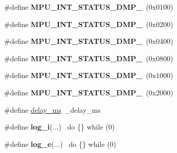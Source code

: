\begin{DoxyCompactItemize}
\item 
\#define {\bfseries M\+P\+U\+\_\+\+I\+N\+T\+\_\+\+S\+T\+A\+T\+U\+S\+\_\+\+D\+M\+P\+\_}~(0x0100)\hypertarget{group___d_r_i_v_e_r_s_ga2398e82f93220e3cfa1ef31bfb6d76bd}{}\label{group___d_r_i_v_e_r_s_ga2398e82f93220e3cfa1ef31bfb6d76bd}

\item 
\#define {\bfseries M\+P\+U\+\_\+\+I\+N\+T\+\_\+\+S\+T\+A\+T\+U\+S\+\_\+\+D\+M\+P\+\_}~(0x0200)\hypertarget{group___d_r_i_v_e_r_s_ga5ac2e94db5083456fa531fceee0997f5}{}\label{group___d_r_i_v_e_r_s_ga5ac2e94db5083456fa531fceee0997f5}

\item 
\#define {\bfseries M\+P\+U\+\_\+\+I\+N\+T\+\_\+\+S\+T\+A\+T\+U\+S\+\_\+\+D\+M\+P\+\_}~(0x0400)\hypertarget{group___d_r_i_v_e_r_s_gab7543433b9679174597e00e5d7cb6279}{}\label{group___d_r_i_v_e_r_s_gab7543433b9679174597e00e5d7cb6279}

\item 
\#define {\bfseries M\+P\+U\+\_\+\+I\+N\+T\+\_\+\+S\+T\+A\+T\+U\+S\+\_\+\+D\+M\+P\+\_}~(0x0800)\hypertarget{group___d_r_i_v_e_r_s_gaea5cac4528bb19757de4eb4fa46a374f}{}\label{group___d_r_i_v_e_r_s_gaea5cac4528bb19757de4eb4fa46a374f}

\item 
\#define {\bfseries M\+P\+U\+\_\+\+I\+N\+T\+\_\+\+S\+T\+A\+T\+U\+S\+\_\+\+D\+M\+P\+\_}~(0x1000)\hypertarget{group___d_r_i_v_e_r_s_ga4345dc987e1b65ef8ddc6160f592e144}{}\label{group___d_r_i_v_e_r_s_ga4345dc987e1b65ef8ddc6160f592e144}

\item 
\#define {\bfseries M\+P\+U\+\_\+\+I\+N\+T\+\_\+\+S\+T\+A\+T\+U\+S\+\_\+\+D\+M\+P\+\_}~(0x2000)\hypertarget{group___d_r_i_v_e_r_s_ga101643480b83c302a4a3089fe9149e8e}{}\label{group___d_r_i_v_e_r_s_ga101643480b83c302a4a3089fe9149e8e}

\item 
\#define \hyperlink{group___d_r_i_v_e_r_s_gae36aca5baf9b6b7d74992aef00686d67}{delay\+\_\+ms}~\+\_\+delay\+\_\+ms
\item 
\#define {\bfseries log\+\_\+i}(...)      ~do \{\} while (0)\hypertarget{group___d_r_i_v_e_r_s_ga67fc07fa528d8e62dc7b88a847b563f5}{}\label{group___d_r_i_v_e_r_s_ga67fc07fa528d8e62dc7b88a847b563f5}

\item 
\#define {\bfseries log\+\_\+e}(...)      ~do \{\} while (0)\hypertarget{group___d_r_i_v_e_r_s_gac9308c888b394d1b403d9ba6e1f13fd2}{}\label{group___d_r_i_v_e_r_s_gac9308c888b394d1b403d9ba6e1f13fd2}


\end{DoxyCompactItemize}
